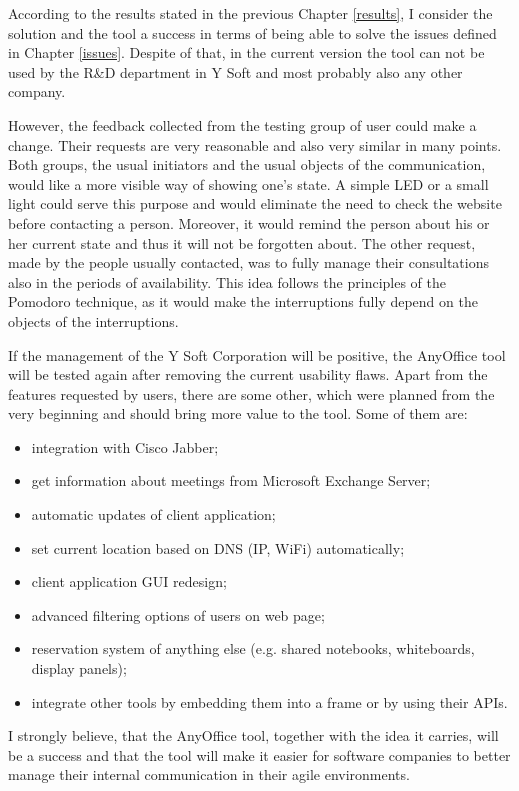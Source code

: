 \documentclass[11pt,singleside]{myfithesis2}
\begin{document}
According to the results stated in the previous Chapter \ref{results}, I consider the solution and the tool a success in terms of being able to solve the issues defined in Chapter \ref{issues}. Despite of that, in the current version the tool can not be used by the R\&D department in Y Soft and most probably also any other company.

However, the feedback collected from the testing group of user could make a change. Their requests are very reasonable and also very similar in many points. Both groups, the usual initiators and the usual objects of the communication, would like a more visible way of showing one's state. A simple LED or a small light could serve this purpose and would eliminate the need to check the website before contacting a person. Moreover, it would remind the person about his or her current state and thus it will not be forgotten about. The other request, made by the people usually contacted, was to fully manage their consultations also in the periods of availability. This idea follows the principles of the Pomodoro technique, as it would make the interruptions fully depend on the objects of the interruptions.

If the management of the Y Soft Corporation will be positive, the AnyOffice tool will be tested again after removing the current usability flaws. Apart from the features requested by users, there are some other, which were planned from the very beginning and should bring more value to the tool. Some of them are:
\begin{itemize}
	\item integration with Cisco Jabber;
	\item get information about meetings from Microsoft Exchange Server;
	\item automatic updates of client application;
	\item set current location based on DNS (IP, WiFi) automatically;
	\item client application GUI redesign;
	\item advanced filtering options of users on web page;
	\item reservation system of anything else (e.g. shared notebooks, whiteboards, display panels);
	\item integrate other tools by embedding them into a frame or by using their APIs.
\end{itemize}

I strongly believe, that the AnyOffice tool, together with the idea it carries, will be a success and that the tool will make it easier for software companies to better manage their internal communication in their agile environments.
\end{document}
